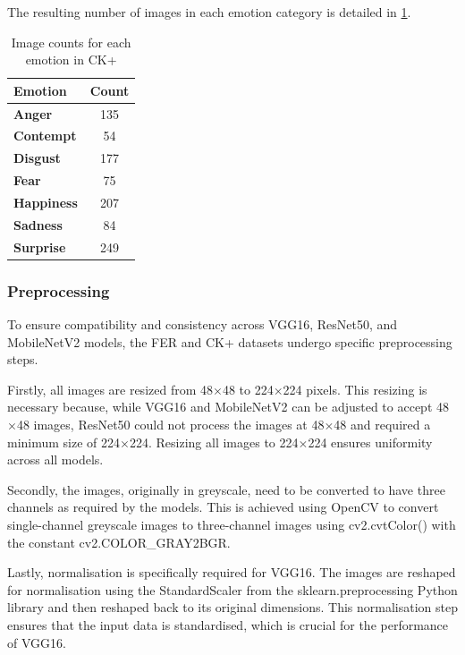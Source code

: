 The resulting number of images in each emotion category is detailed in \ref{tab:emotion_counts_ck+}.

\begin{table}[h!]
\centering{}
\caption{Image counts for each emotion in CK+}
\begin{tabular}{|l|c|}
\hline
\textbf{Emotion}   & \textbf{Count} \\ \hline
\textbf{Anger}     & 135   \\ \hline
\textbf{Contempt}  & 54    \\ \hline
\textbf{Disgust}   & 177   \\ \hline
\textbf{Fear}      & 75    \\ \hline
\textbf{Happiness} & 207   \\ \hline
\textbf{Sadness}   & 84    \\ \hline
\textbf{Surprise}  & 249   \\ \hline
\end{tabular}
\label{tab:emotion_counts_ck+}
\end{table}

\subsubsection{Preprocessing}

To ensure compatibility and consistency across VGG16, ResNet50, and MobileNetV2 models, the FER and CK+ datasets undergo specific preprocessing steps.

Firstly, all images are resized from 48\(\times\)48 to 224\(\times\)224 pixels. This resizing is necessary because, while VGG16 and MobileNetV2 can be adjusted to accept 48\(\times\)48 images, ResNet50 could not process the images at 48\(\times\)48 and required a minimum size of 224\(\times\)224. Resizing all images to 224\(\times\)224 ensures uniformity across all models.

Secondly, the images, originally in greyscale, need to be converted to have three channels as required by the models. This is achieved using OpenCV to convert single-channel greyscale images to three-channel images using cv2.cvtColor() with the constant cv2.COLOR\_GRAY2BGR. 

Lastly, normalisation is specifically required for VGG16. The images are reshaped for normalisation using the StandardScaler from the sklearn.preprocessing Python library and then reshaped back to its original dimensions. This normalisation step ensures that the input data is standardised, which is crucial for the performance of VGG16.

